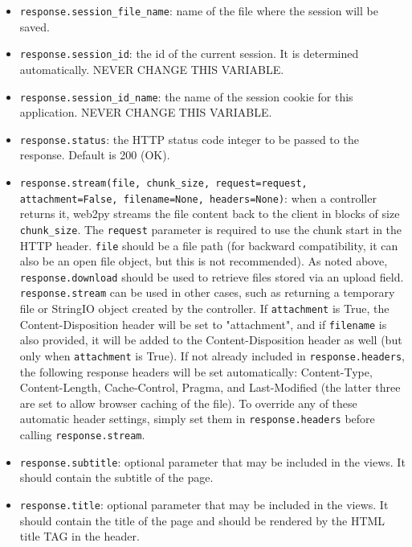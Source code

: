 \documentclass[justified,sixbynine,notoc]{tufte-book}
\def\ft{\small\tt}
\begin{document}
\begin{fullwidth}
\begin{itemize}
\item {\ft response.session\_file\_name}: name of the file where the session will be saved.

\item {\ft response.session\_id}: the id of the current session. It is determined automatically. NEVER CHANGE THIS VARIABLE.

\item {\ft response.session\_id\_name}: the name of the session cookie for this application. NEVER CHANGE THIS VARIABLE.

\item {\ft response.status}: the HTTP status code integer to be passed to the response. Default is 200 (OK).

\item {\ft response.stream(file, chunk\_size, request=request, attachment=False, filename=None, headers=None)}: when a controller returns it, web2py streams the file content back to the client in blocks of size {\ft chunk\_size}. The {\ft request} parameter is required to use the chunk start in the HTTP header. {\ft file} should be a file path (for backward compatibility, it can also be an open file object, but this is not recommended). As noted above, {\ft response.download} should be used to retrieve files stored via an upload field. {\ft response.stream} can be used in other cases, such as returning a temporary file or StringIO object created by the controller. If {\ft attachment} is True, the Content-Disposition header will be set to "attachment", and if {\ft filename} is also provided, it will be added to the Content-Disposition header as well (but only when {\ft attachment} is True). If not already included in {\ft response.headers}, the following response headers will be set automatically: Content-Type, Content-Length, Cache-Control, Pragma, and Last-Modified (the latter three are set to allow browser caching of the file). To override any of these automatic header settings, simply set them in {\ft response.headers} before calling {\ft response.stream}.

\item {\ft response.subtitle}: optional parameter that may be included in the views. It should contain the subtitle of the page.

\item {\ft response.title}: optional parameter that may be included in the views. It should contain the title of the page and should be rendered by the HTML title TAG in the header.


\end{itemize}
\end{fullwidth}
\end{document}
